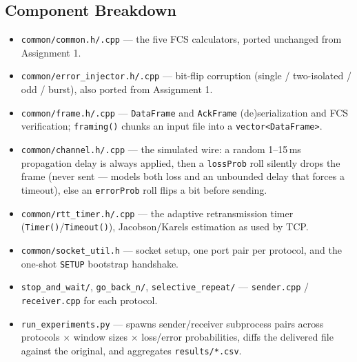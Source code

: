\documentclass[11pt]{article}
\begin{document}
\subsection{Component Breakdown}
\begin{itemize}[leftmargin=1.6em]
  \item \texttt{common/common.h/.cpp} --- the five FCS calculators, ported unchanged from
  Assignment 1.
  \item \texttt{common/error\_injector.h/.cpp} --- bit-flip corruption (single / two-isolated
  / odd / burst), also ported from Assignment 1.
  \item \texttt{common/frame.h/.cpp} --- \texttt{DataFrame} and \texttt{AckFrame}
  (de)serialization and FCS verification; \texttt{framing()} chunks an input file into a
  \texttt{vector<DataFrame>}.
  \item \texttt{common/channel.h/.cpp} --- the simulated wire: a random 1--15\,ms
  propagation delay is always applied, then a \texttt{lossProb} roll silently drops the
  frame (never sent — models both loss and an unbounded delay that forces a timeout), else
  an \texttt{errorProb} roll flips a bit before sending.
  \item \texttt{common/rtt\_timer.h/.cpp} --- the adaptive retransmission timer
  (\texttt{Timer()}/\texttt{Timeout()}), Jacobson/Karels estimation as used by TCP.
  \item \texttt{common/socket\_util.h} --- socket setup, one port pair per protocol, and the
  one-shot \texttt{SETUP} bootstrap handshake.
  \item \texttt{stop\_and\_wait/}, \texttt{go\_back\_n/}, \texttt{selective\_repeat/} ---
  \texttt{sender.cpp} / \texttt{receiver.cpp} for each protocol.
  \item \texttt{run\_experiments.py} --- spawns sender/receiver subprocess pairs across
  protocols $\times$ window sizes $\times$ loss/error probabilities, diffs the delivered file
  against the original, and aggregates \texttt{results/*.csv}.
\end{itemize}
\end{document}

